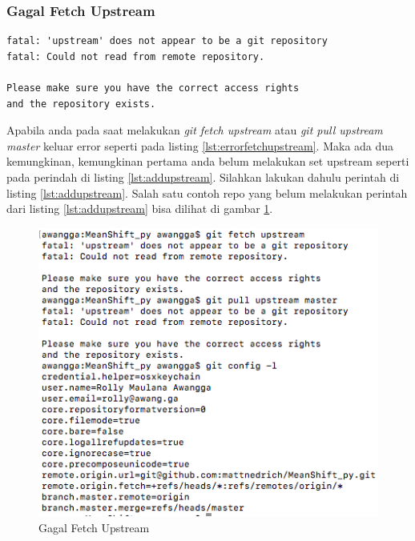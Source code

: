 \subsubsection{Gagal Fetch Upstream}
\begin{lstlisting}[caption=Gagal melakukan fetch upstream,label={lst:errorfetchupstream}]
fatal: 'upstream' does not appear to be a git repository
fatal: Could not read from remote repository.

Please make sure you have the correct access rights
and the repository exists.
\end{lstlisting}
Apabila anda pada saat melakukan \textit{git fetch upstream} atau \textit{git pull upstream master} keluar error seperti pada listing \ref{lst:errorfetchupstream}. Maka ada dua kemungkinan, kemungkinan pertama anda belum melakukan set upstream seperti pada perindah di listing \ref{lst:addupstream}. Silahkan lakukan dahulu perintah di listing \ref{lst:addupstream}. Salah satu contoh repo yang belum melakukan perintah dari listing \ref{lst:addupstream} bisa dilihat di gambar \ref{errorfetch}.

\begin{figure}[!htbp]
\centerline{\includegraphics[width=.75\textwidth]{Figures/errorfetch}}
\caption{Gagal Fetch Upstream}
\label{errorfetch}
\end{figure}

